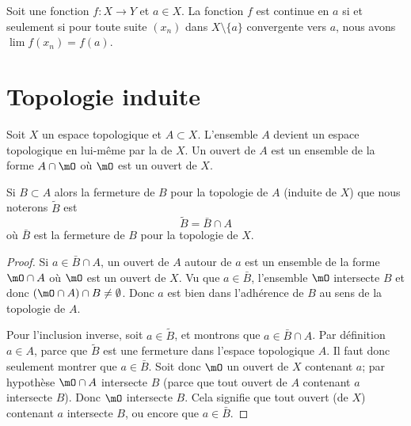 \begin{proposition}		\label{PropFnContParSuite}
	Soit une fonction $f\colon X\to Y$ et $a\in X$. La fonction $f$ est continue en $a$ si et seulement si pour toute suite $(x_n)$ dans $X\setminus\{ a \}$ convergente vers $a$, nous avons $\lim f(x_n)=f(a)$.
\end{proposition}

\section{Topologie induite}

Soit \( X\) un espace topologique et \( A\subset X\). L'ensemble \( A\) devient un espace topologique en lui-même par la  de \( X\). Un ouvert de \( A\) est un ensemble de la forme \( A\cap\mO\) où \( \mO\) est un ouvert de \( X\).

\begin{lemma}       \label{LemkUYkQt}
    Si \( B\subset A\) alors la fermeture de \( B\) pour la topologie de \( A\) (induite de \( X\)) que nous noterons \( \tilde B\) est 
    \begin{equation}
        \tilde B=\bar B\cap A
    \end{equation}
    où \( \bar B\) est la fermeture de \( B\) pour la topologie de \( X\).
\end{lemma}

\begin{proof}
    Si \( a\in \bar B\cap A\), un ouvert de \( A\) autour de \( a\) est un ensemble de la forme \( \mO\cap A\) où \( \mO\) est un ouvert de \( X\). Vu que \( a\in\bar B\), l'ensemble \( \mO\) intersecte \( B\) et donc \( (\mO\cap A)\cap B\neq \emptyset\). Donc \( a\) est bien dans l'adhérence de \( B\) au sens de la topologie de \( A\).

    Pour l'inclusion inverse, soit \( a\in \tilde  B\), et montrons que \( a\in \bar B\cap A\). Par définition \( a\in A\), parce que \( \tilde B\) est une fermeture dans l'espace topologique \( A\). Il faut donc seulement montrer que \( a\in\bar B\). Soit donc \( \mO\) un ouvert de \( X\) contenant \( a\); par hypothèse \( \mO\cap A\) intersecte \( B\) (parce que tout ouvert de \( A\) contenant \( a\) intersecte \( B\)). Donc \( \mO\) intersecte \( B\). Cela signifie que tout ouvert (de \( X\)) contenant \( a\) intersecte \( B\), ou encore que \( a\in \bar B\).
\end{proof}

